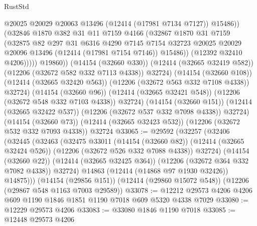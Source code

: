 \begin{lexlean}{RustStd}
\begin{coremodule}
                          @20025
                          @20029
                          @20063
                          @13496
                          (@12414 (@17981 @7134 @7127))
                          @15486))
                      (@32846
                        @1870
                        @382
                        @31
                        @11
                        @7159
                        @4166
                        (@32867
                          @1870
                          @31
                          @7159
                          (@32875
                            @82
                            @297
                            @31
                            @6316
                            @4290
                            @7145
                            @7154
                            @32723
                            @20025
                            @20029
                            @20096
                            @13496
                            (@12414 (@17981 @7154 @7146))
                            @15486))
                        (@12392 @32410 @4206)))))
                @19860))
            (@14154 (@32660 @330))
            (@12414 (@32665 @32419 @582))
            (@12206 (@32672 @582 @332 @7113 @4338))
            @32724)
          (@14154 (@32660 @108))
          (@12414 (@32665 @32420 @563))
          (@12206 (@32672 @563 @332 @7108 @4338))
          @32724)
        (@14154 (@32660 @96))
        (@12414 (@32665 @32421 @548))
        (@12206 (@32672 @548 @332 @7103 @4338))
        @32724)
      (@14154 (@32660 @151))
      (@12414 (@32665 @32422 @537))
      (@12206 (@32672 @537 @332 @7098 @4338))
      @32724)
    (@14154 (@32660 @73))
    (@12414 (@32665 @32423 @532))
    (@12206 (@32672 @532 @332 @7093 @4338))
    @32724
@33065 := @29592
    (@32257
      (@32406
        (@32445
          (@32463
            (@32475
              @33011
              (@14154 (@32660 @82))
              (@12414 (@32665 @32424 @526))
              (@12206 (@32672 @526 @332 @7088 @4338))
              @32724)
            (@14154 (@32660 @22))
            (@12414 (@32665 @32425 @364))
            (@12206 (@32672 @364 @332 @7082 @4338))
            @32724)
          @14863
          (@12414 (@14868 @97 @1930 @32426))
          @14875)))
    (@14154 (@29856 @151))
    (@12414 (@29860 @15072 @548))
    (@12206 (@29867 @548 @1163 @7003 @29589))
@33078 := @12212 @29573 @4206 @4206 @609 @1190 @1846 @1851 @1190 @7018 @609 @5320 @4338 @7029
@33080 := @12229 @29573 @4206
@33083 := @33080 @1846 @1190 @7018
@33085 := @12448 @29573 @4206

\end{coremodule}
\end{lexlean}
